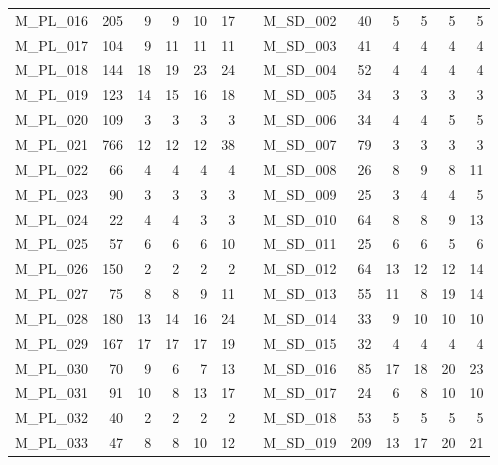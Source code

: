 \begin{table}[htbp]
\begin{tabular}{lrrrrrrrrrrrr}
    M\_PL\_016 & 205  & 9    & 9    & 10   & 17   &      & M\_SD\_002 & 40   & 5    & 5    & 5    & 5 \\
    M\_PL\_017 & 104  & 9    & 11   & 11   & 11   &      & M\_SD\_003 & 41   & 4    & 4    & 4    & 4 \\
    M\_PL\_018 & 144  & 18   & 19   & 23   & 24   &      & M\_SD\_004 & 52   & 4    & 4    & 4    & 4 \\
    M\_PL\_019 & 123  & 14   & 15   & 16   & 18   &      & M\_SD\_005 & 34   & 3    & 3    & 3    & 3 \\
    M\_PL\_020 & 109  & 3    & 3    & 3    & 3    &      & M\_SD\_006 & 34   & 4    & 4    & 5    & 5 \\
    M\_PL\_021 & 766  & 12   & 12   & 12   & 38   &      & M\_SD\_007 & 79   & 3    & 3    & 3    & 3 \\
    M\_PL\_022 & 66   & 4    & 4    & 4    & 4    &      & M\_SD\_008 & 26   & 8    & 9    & 8    & 11 \\
    M\_PL\_023 & 90   & 3    & 3    & 3    & 3    &      & M\_SD\_009 & 25   & 3    & 4    & 4    & 5 \\
    M\_PL\_024 & 22   & 4    & 4    & 3    & 3    &      & M\_SD\_010 & 64   & 8    & 8    & 9    & 13 \\
    M\_PL\_025 & 57   & 6    & 6    & 6    & 10   &      & M\_SD\_011 & 25   & 6    & 6    & 5    & 6 \\
    M\_PL\_026 & 150  & 2    & 2    & 2    & 2    &      & M\_SD\_012 & 64   & 13   & 12   & 12   & 14 \\
    M\_PL\_027 & 75   & 8    & 8    & 9    & 11   &      & M\_SD\_013 & 55   & 11   & 8    & 19   & 14 \\
    M\_PL\_028 & 180  & 13   & 14   & 16   & 24   &      & M\_SD\_014 & 33   & 9    & 10   & 10   & 10 \\
    M\_PL\_029 & 167  & 17   & 17   & 17   & 19   &      & M\_SD\_015 & 32   & 4    & 4    & 4    & 4 \\
    M\_PL\_030 & 70   & 9    & 6    & 7    & 13   &      & M\_SD\_016 & 85   & 17   & 18   & 20   & 23 \\
    M\_PL\_031 & 91   & 10   & 8    & 13   & 17   &      & M\_SD\_017 & 24   & 6    & 8    & 10   & 10 \\
    M\_PL\_032 & 40   & 2    & 2    & 2    & 2    &      & M\_SD\_018 & 53   & 5    & 5    & 5    & 5 \\
    M\_PL\_033 & 47   & 8    & 8    & 10   & 12   &      & M\_SD\_019 & 209  & 13   & 17   & 20   & 21 \\

\end{tabular}
\end{table}
